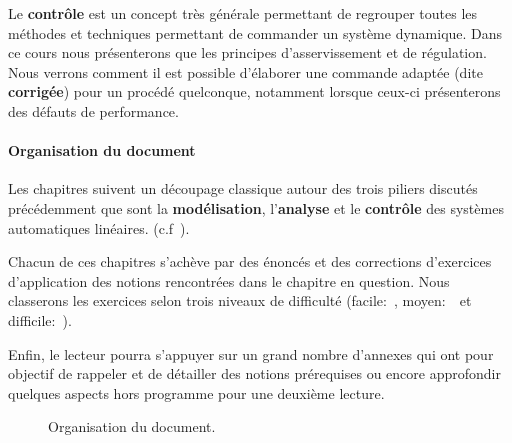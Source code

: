 Le \textbf{contrôle} est un concept très générale permettant de regrouper
toutes les méthodes et techniques permettant de commander un système dynamique.
Dans ce cours nous présenterons que les principes d'asservissement et de 
régulation. Nous verrons comment il est possible d'élaborer une commande 
adaptée (dite \textbf{corrigée}) pour un procédé quelconque, notamment 
lorsque ceux-ci présenterons des défauts de performance.

\paragraph{Organisation du document}
Les chapitres suivent un découpage classique autour des trois piliers 
discutés précédemment que sont la \textbf{modélisation}, l'\textbf{analyse} 
et le \textbf{contrôle} des systèmes automatiques linéaires. 
(c.f~).

Chacun de ces chapitres s'achève par des énoncés et des corrections d'exercices 
d'application des notions rencontrées dans le chapitre en question. 
Nous classerons les exercices selon trois niveaux de difficulté 
(facile:~\facile, moyen:~\moyen~et difficile:~\difficile).

Enfin, le lecteur pourra s'appuyer sur un grand nombre d'annexes qui ont pour
objectif de rappeler et de détailler des notions prérequises ou encore
approfondir quelques aspects hors programme pour une deuxième lecture.
\begin{figure}[!h]
    \renewcommand\thefigure{A}
    \centering
        {
            \tikzset{external/export=false}
            
        }
    \caption{Organisation du document.\label{fig-diagramme_cours}}
\end{figure}
